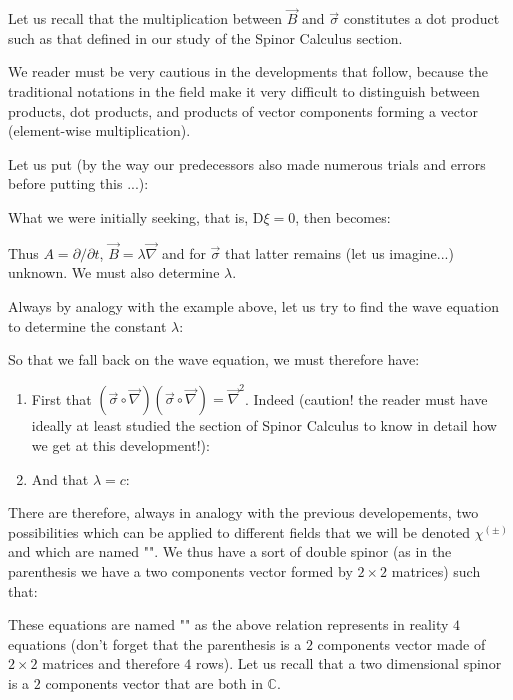 	Let us recall that the multiplication between $\vec{B}$ and $\vec{\sigma}$ constitutes a dot product such as that defined in our study of the Spinor Calculus section.
	\begin{tcolorbox}[title=Remark,colframe=black,arc=10pt]
	We reader must be very cautious in the developments that follow, because the traditional notations in the field make it very difficult to distinguish between products, dot products, and products of vector components forming a vector (element-wise multiplication).
	\end{tcolorbox}
	Let us put (by the way our predecessors also made numerous trials and errors before putting this ...):
	
	What we were initially seeking, that is, $\mathrm{D}\xi=0$, then becomes:
	
	Thus $A=\partial/\partial t$, $\vec{B}=\lambda\vec{\nabla}$ and for $\vec{\sigma}$ that latter remains (let us imagine...) unknown. We must also determine $\lambda$.
	
	Always by analogy with the example above, let us try to find the wave equation to determine the constant $\lambda$:
	
	So that we fall back on the wave equation, we must therefore have:
	\begin{enumerate}
		\item First that $\left(\vec{\sigma}\circ\vec{\nabla}\right)\left(\vec{\sigma}\circ\vec{\nabla}\right)=\vec{\nabla}^2$. Indeed (caution! the reader must have ideally at least studied the section of Spinor Calculus to know in detail how we get at this development!):
		
	
		\item And that $\lambda=c$:
		
	\end{enumerate}
	There are therefore, always in analogy with the previous developements, two possibilities which can be applied to different fields that we will be denoted $\chi^{(\pm)}$ and which are named "". We thus have a sort of double spinor (as in the parenthesis we have a two components vector formed by $2\times 2$ matrices) such that:
	
	These equations are named "" as the above relation represents in reality $4$ equations (don't forget that the parenthesis is a $2$ components vector made of $2\times 2$ matrices and therefore $4$ rows). Let us recall that a two dimensional spinor is a $2$ components vector that are both in $\mathbb{C}$.

